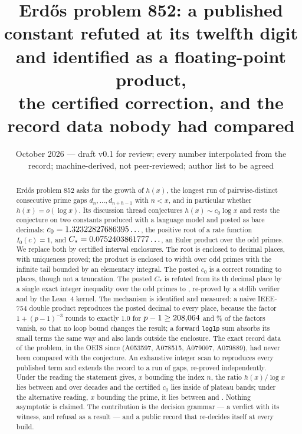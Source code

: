 \documentclass[11pt]{article}
\title{Erd\H{o}s problem 852: a published constant refuted at its twelfth digit and identified as a floating-point product,\\ the certified correction, and the record data nobody had compared}
\author{\cmauthor}
\date{October 2026 --- draft v0.1 for review; every number interpolated from the record; machine-derived, not peer-reviewed; author list to be agreed}
\theoremstyle{definition}\newtheorem{observation}{Observation}
\newcommand{\Cstar}{C_{*}}
\begin{document}
\maketitle

\begin{abstract}
Erd\H{o}s problem 852 asks for the growth of $h(x)$, the longest run of pairwise-distinct consecutive prime gaps $d_n,\dots,d_{n+h-1}$ with $n<x$, and in particular whether $h(x)=o(\log x)$. Its discussion thread conjectures $h(x)\sim c_0\log x$ and rests the conjecture on two constants produced with a language model and posted as bare decimals: $c_0=1.32322827686395\ldots$, the positive root of a rate function $I_0(c)=1$, and $\Cstar=\CstarPublished\ldots$, an Euler product over the odd primes. We replace both by certified interval enclosures. The root is enclosed to \CzeroDecimals{} decimal places, with uniqueness proved; the product is enclosed to width \CstarWidthShort{} over \CstarPrimes{} odd primes with the infinite tail bounded by an elementary integral. The posted $c_0$ is a correct rounding to \CzeroPubDecimals{} places, though not a truncation. The posted $\Cstar$ is refuted from its \CstarDiffDecimal{}th decimal place by a single exact integer inequality over the odd primes to \RefLimit, re-proved by a stdlib verifier and by the Lean~4 kernel. The mechanism is identified and measured: a naive IEEE-754 double product reproduces the posted decimal to every place, because the factor $1+(p-1)^{-3}$ rounds to exactly $1.0$ for $p-1\ge208{,}064$ and \NaiveDropPct\% of the factors vanish, so that no loop bound changes the result; a forward \texttt{log1p} sum absorbs its small terms the same way and also lands outside the enclosure. The exact record data of the problem, in the OEIS since \OeisFirstYear{} (A053597, A078515, A079007, A079889), had never been compared with the conjecture. An exhaustive integer scan to \HLimit{} reproduces every published term and extends the record to a run of \HMax{} gaps, re-proved independently. Under the reading the statement gives, $x$ bounding the index $n$, the ratio $h(x)/\log x$ lies between \IndexRatioMin{} and \IndexRatioMax{} over \Decades{} decades and the certified $c_0$ lies inside \BandsInside{} of \BandsClosed{} plateau bands; under the alternative reading, $x$ bounding the prime, it lies between \PrimeRatioMin{} and \PrimeRatioMax. Nothing asymptotic is claimed. The contribution is the decision grammar --- a verdict with its witness, and refusal as a result --- and a public record that re-decides itself at every build.
\end{abstract}
\end{document}
